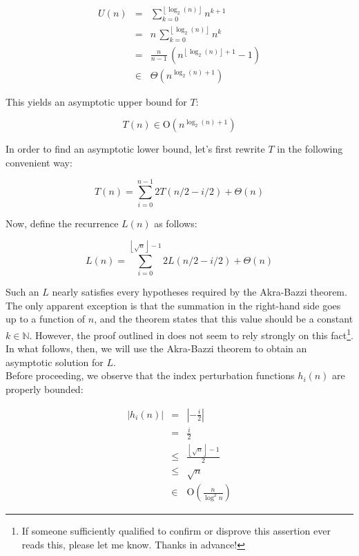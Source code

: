\documentclass[a4paper,10pt]{article}
\newcommand{\BigO}[1]{\ensuremath{\textrm{O}\left(#1\right)}}
\newcommand{\Nat}{\ensuremath{\mathbb{N}}}
\newcommand{\floor}[1]{\ensuremath{\left\lfloor #1 \right\rfloor}}
\begin{document}
\begin{eqnarray*}
    U(n) &=& \displaystyle \sum_{k = 0}^{\floor{\log_2(n)}}{n^{k+1}} \\
         &=& n \, \displaystyle \sum_{k = 0}^{\floor{\log_2(n)}}{n^k} \\
         &=& \frac{n}{n-1} \, \left(n^{\floor{\log_2(n)} + 1} - 1 \right) \\
         &\in& \Theta \left(n^{\log_2(n) + 1} \right)
\end{eqnarray*}

This yields an asymptotic upper bound for $T$:

\begin{equation}
\label{eq:bigO}
    T(n) \in \BigO{n^{\log_2(n) + 1}}
\end{equation}

In order to find an asymptotic lower bound, let's first rewrite $T$ in the following convenient way:

\begin{equation*}
    T(n) = \displaystyle \sum_{i = 0}^{n-1}{2T(n/2 - i/2)} + \Theta(n)
\end{equation*} 

Now, define the recurrence $L(n)$ as follows:

\begin{equation*}
    L(n) = \displaystyle \sum_{i = 0}^{\floor{\sqrt{n}} - 1}{2L(n/2 - i/2)} + \Theta(n)
\end{equation*}

Such an $L$ nearly satisfies every hypotheses required by the Akra-Bazzi theorem\cite{AB}. The only apparent exception is that the summation in the right-hand side goes up to a function of $n$, and the theorem states that this value should be a constant $k \in \Nat$. However, the proof outlined in \cite{AB} does not seem to rely strongly on this fact\footnote{If someone sufficiently qualified to confirm or disprove this assertion ever reads this, please let me know. Thanks in advance!}. In what follows, then, we will use the Akra-Bazzi theorem to obtain an asymptotic solution for $L$.\\

Before proceeding, we observe that the index perturbation functions $h_i(n)$ are properly bounded:

\begin{eqnarray}
\label{eq:h}
    |h_i(n)| &=& |-\frac{i}{2}| \nonumber \\
             &=& \frac{i}{2} \nonumber \\
             &\leq& \frac{\floor{\sqrt{n}} - 1}{2} \nonumber \\
             &\leq& \sqrt{n} \nonumber \\
             &\in& \BigO{\frac{n}{\log^2{n}}}
\end{eqnarray}
\end{document}
